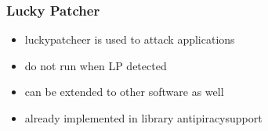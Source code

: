 \subsubsection{Lucky Patcher} \label{subsection:counter-improve-tampering-luckypatcher}
\begin{itemize}
  \item luckypatcheer is used to attack applications
  \item do not run when LP detected
  \item  can be extended to other software as well
  \item already implemented in library antipiracysupport
\end{itemize}
